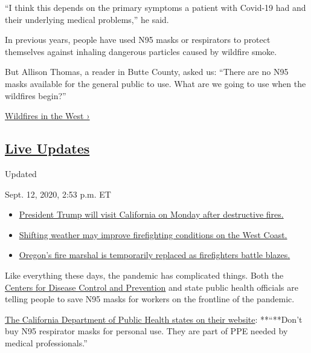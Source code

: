``I think this depends on the primary symptoms a patient with Covid-19
had and their underlying medical problems,'' he said.

In previous years, people have used N95 masks or respirators to protect
themselves against inhaling dangerous particles caused by wildfire
smoke.

But Allison Thomas, a reader in Butte County, asked us: ``There are no
N95 masks available for the general public to use. What are we going to
use when the wildfires begin?''

\href{https://www.nytimes3xbfgragh.onion/spotlight/california-wildfires}{Wildfires
in the West ›}

\hypertarget{live-updates}{%
\subsection{\texorpdfstring{\href{https://www.nytimes3xbfgragh.onion/2020/09/12/us/wildfires-live-updates.html}{Live
Updates}}{Live Updates}}\label{live-updates}}

Updated~

Sept. 12, 2020, 2:53 p.m. ET

\begin{itemize}
\tightlist
\item
  \href{https://www.nytimes3xbfgragh.onion/2020/09/12/us/wildfires-live-updates.html\#link-f3961ff}{President
  Trump will visit California on Monday after destructive fires.}
\item
  \href{https://www.nytimes3xbfgragh.onion/2020/09/12/us/wildfires-live-updates.html\#link-7e503ae9}{Shifting
  weather may improve firefighting conditions on the West Coast.}
\item
  \href{https://www.nytimes3xbfgragh.onion/2020/09/12/us/wildfires-live-updates.html\#link-5e4c548d}{Oregon's
  fire marshal is temporarily replaced as firefighters battle blazes.}
\end{itemize}

Like everything these days, the pandemic has complicated things. Both
the
\href{https://www.fda.gov/medical-devices/personal-protective-equipment-infection-control/n95-respirators-surgical-masks-and-face-masks\#s1}{Centers
for Disease Control and Prevention} and state public health officials
are telling people to save N95 masks for workers on the frontline of the
pandemic.

\href{https://covid19.ca.gov/masks-and-ppe/}{The California Department
of Public Health states on their website}: **``**Don't buy N95
respirator masks for personal use. They are part of PPE needed by
medical professionals.''

